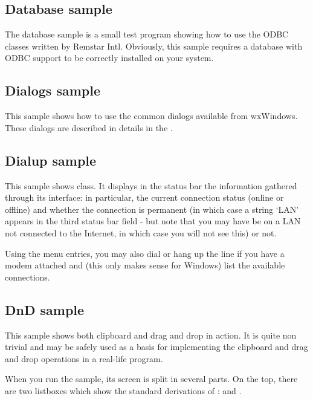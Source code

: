 \subsection{Database sample}\label{sampledb}

The database sample is a small test program showing how to use the ODBC
classes written by Remstar Intl.  Obviously, this sample requires a 
database with ODBC support to be correctly installed on your system.


\subsection{Dialogs sample}\label{sampledialogs}

This sample shows how to use the common dialogs available from wxWindows. These
dialogs are described in details in the .


\subsection{Dialup sample}\label{sampledialup}

This sample shows  
class. It displays in the status bar the information gathered through its
interface: in particular, the current connection status (online or offline) and
whether the connection is permanent (in which case a string `LAN' appears in
the third status bar field - but note that you may have be on a LAN not
connected to the Internet, in which case you will not see this) or not.

Using the menu entries, you may also dial or hang up the line if you have a
modem attached and (this only makes sense for Windows) list the available
connections.


\subsection{DnD sample}\label{samplednd}

This sample shows both clipboard and drag and drop in action. It is quite non
trivial and may be safely used as a basis for implementing the clipboard and
drag and drop operations in a real-life program.

When you run the sample, its screen is split in several parts. On the top,
there are two listboxes which show the standard derivations of 
: 
 and 
.

